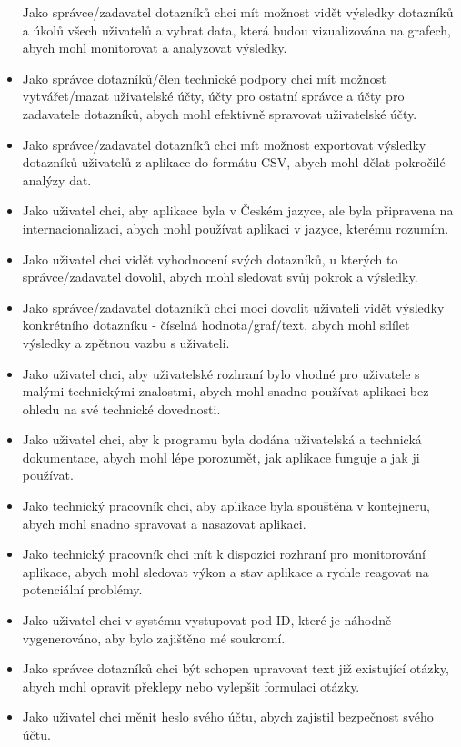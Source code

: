 \begin{itemize}
  Jako správce/zadavatel dotazníků chci mít možnost vidět výsledky dotazníků a úkolů všech uživatelů a vybrat data, která budou vizualizována na grafech, abych mohl monitorovat a analyzovat výsledky.
  \item
  Jako správce dotazníků/člen technické podpory chci mít možnost vytvářet/mazat uživatelské účty, účty pro ostatní správce a účty pro zadavatele dotazníků, abych mohl efektivně spravovat uživatelské účty.
  \item
  Jako správce/zadavatel dotazníků chci mít možnost exportovat výsledky dotazníků uživatelů z aplikace do formátu CSV, abych mohl dělat pokročilé analýzy dat.
  \item
  Jako uživatel chci, aby aplikace byla v Českém jazyce, ale byla připravena na internacionalizaci, abych mohl používat aplikaci v jazyce, kterému rozumím.
  \item
  Jako uživatel chci vidět vyhodnocení svých dotazníků, u kterých to správce/zadavatel dovolil, abych mohl sledovat svůj pokrok a výsledky.
  \item
  Jako správce/zadavatel dotazníků chci moci dovolit uživateli vidět výsledky konkrétního dotazníku - číselná hodnota/graf/text, abych mohl sdílet výsledky a zpětnou vazbu s uživateli.
  \item
  Jako uživatel chci, aby uživatelské rozhraní bylo vhodné pro uživatele s malými technickými znalostmi, abych mohl snadno používat aplikaci bez ohledu na své technické dovednosti.
  \item
  Jako uživatel chci, aby k programu byla dodána uživatelská a technická dokumentace, abych mohl lépe porozumět, jak aplikace funguje a jak ji používat.
  \item
  Jako technický pracovník chci, aby aplikace byla spouštěna v kontejneru, abych mohl snadno spravovat a nasazovat aplikaci.
  \item
  Jako technický pracovník chci mít k dispozici rozhraní pro monitorování aplikace, abych mohl sledovat výkon a stav aplikace a rychle reagovat na potenciální problémy.
  \item
  Jako uživatel chci v systému vystupovat pod ID, které je náhodně vygenerováno, aby bylo zajištěno mé soukromí.
  \item
  Jako správce dotazníků chci být schopen upravovat text již existující otázky, abych mohl opravit překlepy nebo vylepšit formulaci otázky.
  \item
  Jako uživatel chci měnit heslo svého účtu, abych zajistil bezpečnost svého účtu.
\end{itemize}

